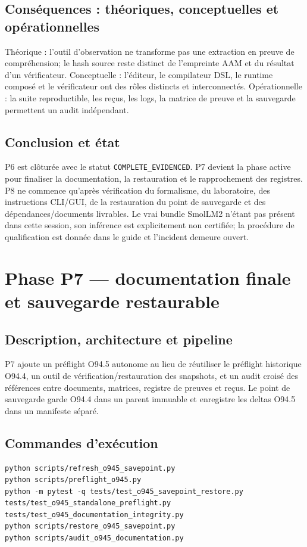 \documentclass[11pt,a4paper]{article}
\begin{document}
\subsection{Conséquences : théoriques, conceptuelles et opérationnelles}
Théorique : l'outil d'observation ne transforme pas une extraction en preuve de compréhension; le hash source reste distinct de l'empreinte AAM et du résultat d’un vérificateur. Conceptuelle : l'éditeur, le compilateur DSL, le runtime composé et le vérificateur ont des rôles distincts et interconnectés. Opérationnelle : la suite reproductible, les reçus, les logs, la matrice de preuve et la sauvegarde permettent un audit indépendant.

\subsection{Conclusion et état}
P6 est clôturée avec le statut \texttt{COMPLETE\_EVIDENCED}. P7 devient la phase active pour finaliser la documentation, la restauration et le rapprochement des registres. P8 ne commence qu'après vérification du formalisme, du laboratoire, des instructions CLI/GUI, de la restauration du point de sauvegarde et des dépendances/documents livrables. Le vrai bundle SmolLM2 n'étant pas présent dans cette session, son inférence est explicitement non certifiée; la procédure de qualification est donnée dans le guide et l'incident demeure ouvert.


\section{Phase P7 — documentation finale et sauvegarde restaurable}
\subsection{Description, architecture et pipeline}
P7 ajoute un préflight O94.5 autonome au lieu de réutiliser le préflight historique O94.4, un outil de vérification/restauration des snapshots, et un audit croisé des références entre documents, matrices, registre de preuves et reçus. Le point de sauvegarde garde O94.4 dans un parent immuable et enregistre les deltas O94.5 dans un manifeste séparé.

\subsection{Commandes d'exécution}
\begin{verbatim}
python scripts/refresh_o945_savepoint.py
python scripts/preflight_o945.py
python -m pytest -q tests/test_o945_savepoint_restore.py tests/test_o945_standalone_preflight.py tests/test_o945_documentation_integrity.py
python scripts/restore_o945_savepoint.py
python scripts/audit_o945_documentation.py
\end{verbatim}
\end{document}
